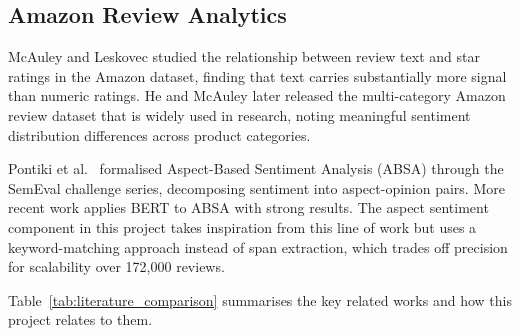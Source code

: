 \subsection{Amazon Review Analytics}
\begin{justify}
McAuley and Leskovec \cite{mcauley2013hidden} studied the relationship between review text and star ratings in the Amazon dataset, finding that text carries substantially more signal than numeric ratings. He and McAuley \cite{he2016ups} later released the multi-category Amazon review dataset that is widely used in research, noting meaningful sentiment distribution differences across product categories.

Pontiki et al.\ \cite{pontiki2014semeval} formalised Aspect-Based Sentiment Analysis (ABSA) through the SemEval challenge series, decomposing sentiment into aspect-opinion pairs. More recent work \cite{xu2020bert} applies BERT to ABSA with strong results. The aspect sentiment component in this project takes inspiration from this line of work but uses a keyword-matching approach instead of span extraction, which trades off precision for scalability over 172,000 reviews.

Table~\ref{tab:literature_comparison} summarises the key related works and how this project relates to them.
\end{justify}

\begin{table}[H]
\centering
\small
\caption{Comparison of Related Work in Review Sentiment and Topic Analysis}
\renewcommand{\arraystretch}{1.3}
\label{tab:literature_comparison}
\end{table}
